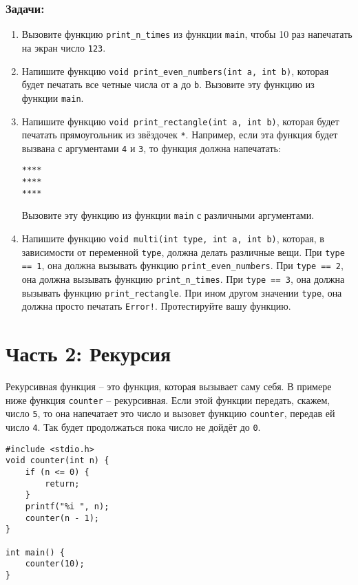 \documentclass{article}
\begin{document}
\subsubsection*{Задачи:}
\begin{enumerate}
\item Вызовите функцию \texttt{print\_n\_times} из функции \texttt{main}, чтобы 10 раз напечатать на экран число \texttt{123}.
\item Напишите функцию \texttt{void print\_even\_numbers(int a, int b)}, которая будет печатать все четные числа от \texttt{a} до \texttt{b}. Вызовите эту функцию из функции \texttt{main}.
\item Напишите функцию \texttt{void print\_rectangle(int a, int b)}, которая будет печатать прямоугольник из звёздочек \texttt{*}.  Например, если эта функция будет вызвана с аргументами \texttt{4} и \texttt{3}, то функция должна напечатать:
\begin{verbatim}
****
****
****
\end{verbatim}
Вызовите эту функцию из функции \texttt{main} с различными аргументами.
\item Напишите функцию \texttt{void multi(int type, int a, int b)}, которая, в зависимости от переменной \texttt{type}, должна делать различные вещи. При \texttt{type == 1}, она должна вызывать функцию  \texttt{print\_even\_numbers}. При \texttt{type == 2}, она должна вызывать функцию  \texttt{print\_n\_times}. При \texttt{type == 3}, она должна вызывать функцию  \texttt{print\_rectangle}. При ином другом значении \texttt{type}, она должна просто печатать \texttt{Error!}. Протестируйте вашу функцию.
\end{enumerate}

\newpage
\section*{Часть 2: Рекурсия}
Рекурсивная функция -- это функция, которая вызывает саму себя.  В примере ниже функция \texttt{counter} -- рекурсивная. Если этой функции передать, скажем, число \texttt{5}, то она напечатает это число и вызовет функцию \texttt{counter}, передав ей число \texttt{4}. Так будет продолжаться пока число не дойдёт до \texttt{0}.
\begin{lstlisting}
#include <stdio.h>
void counter(int n) {
    if (n <= 0) {
        return;
    }
    printf("%i ", n);
    counter(n - 1);
}

int main() {
    counter(10);
}
\end{lstlisting}
\end{document}
